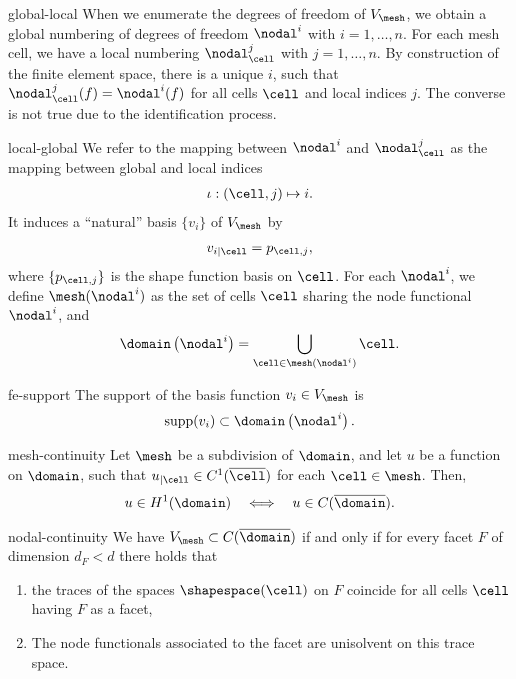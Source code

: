 \begin{Notation}{global-local}
  When we enumerate the degrees of freedom of $V_\mesh$, we obtain a
  global numbering of degrees of freedom $\nodal^i$ with
  $i=1,\dots,n$. For each mesh cell, we have a local numbering
  $\nodal_\cell^j$ with $j=1,\dots,n$. By construction of the finite
  element space, there is a unique $i$, such that
  $\nodal_\cell^j(f) = \nodal^i(f)$ for all cells $\cell$ and local
  indices $j$. The converse is not true due to the identification
  process.
\end{Notation}

\begin{Definition}{local-global}
  We refer to the mapping between $\nodal^i$ and $\nodal_\cell^j$ as
  the mapping between global and local indices
  \begin{gather}
    \iota: (\cell, j) \mapsto i.
  \end{gather}
  It induces a
  ``natural'' basis $\{v_i\}$ of $V_\mesh$ by
  \begin{gather}
    v_{i|\cell} = p_{\cell,j},
  \end{gather}
  where $\{p_{\cell,j}\}$ is the shape function basis on $\cell$. For
  each $\nodal^i$, we define $\mesh(\nodal^i)$ as the set of cells
  $\cell$ sharing the node functional $\nodal^i$, and
  \begin{gather}
    \domain\left(\nodal^i\right) = \bigcup_{\cell\in \mesh(\nodal^i)} \cell.
  \end{gather}
\end{Definition}

\begin{Lemma}{fe-support}
  The support of the basis function $v_i\in V_\mesh$ is
  \begin{gather*}
    \operatorname{supp}(v_i) \subset \domain\left(\nodal^i\right).
  \end{gather*}
\end{Lemma}

\begin{Lemma}{mesh-continuity}
  Let $\mesh$ be a subdivision of $\domain$, and let $u$ be a function
  on $\domain$, such that $u_{|\cell} \in C^1(\overline{\cell})$ for
  each $\cell\in\mesh$. Then,
  \begin{gather}
    u\in H^1(\domain)
    \quad \Longleftrightarrow\quad
    u\in C(\overline\domain).
  \end{gather}
\end{Lemma}

\begin{Lemma}{nodal-continuity}
  We have $V_\mesh\subset C(\overline{\domain})$ if and only if for
  every facet $F$ of dimension $d_F < d$ there holds that
  \begin{enumerate}
  \item the traces of the spaces $\shapespace(\cell)$ on $F$ coincide
    for all cells $\cell$ having $F$ as a facet,
  \item The node functionals associated to the facet are unisolvent on
    this trace space.
  \end{enumerate}
\end{Lemma}

